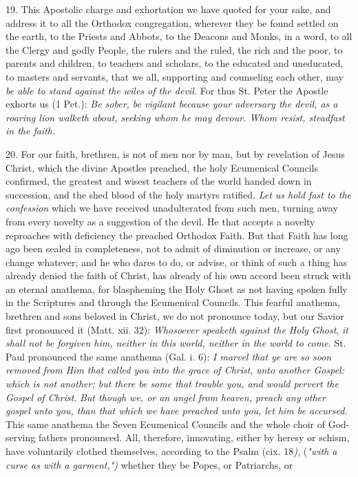19. This Apostolic charge and exhortation we have quoted for your sake,
and address it to all the Orthodox congregation, wherever they be found
settled on the earth, to the Priests and Abbots, to the Deacons and
Monks, in a word, to all the Clergy and godly People, the rulers and the
ruled, the rich and the poor, to parents and children, to teachers and
scholars, to the educated and uneducated, to masters and servants, that
we all, supporting and counseling each other, may \emph{be able to stand
against the wiles of the devil.} For thus St. Peter the Apostle exhorts
us (1 Pet.): \emph{Be sober, be vigilant because your adversary the
devil, as a roaring lion walketh about, seeking whom he may devour. Whom
resist, steadfast in the faith.}

20. For our faith, brethren, is not of men nor by man, but by revelation
of Jesus Christ, which the divine Apostles preached, the holy Ecumenical
Councils confirmed, the greatest and wisest teachers of the world handed
down in succession, and the shed blood of the holy martyrs ratified.
\emph{Let us hold fast to the confession} which we have received
unadulterated from such men, turning away from every novelty as a
suggestion of the devil. He that accepts a novelty reproaches with
deficiency the preached Orthodox Faith. But that Faith has long ago been
sealed in completeness, not to admit of diminution or increase, or any
change whatever; and he who dares to do, or advise, or think of such a
thing has already denied the faith of Christ, has already of his own
accord been struck with an eternal anathema, for blaspheming the Holy
Ghost as not having spoken fully in the Scriptures and through the
Ecumenical Councils. This fearful anathema, brethren and sons beloved in
Christ, we do not pronounce today, but our Savior first pronounced it
(Matt. xii. 32): \emph{Whosoever speaketh against the Holy Ghost},
\emph{it shall not be forgiven him, neither in this world, neither in
the world to come.} St. Paul pronounced the same anathema (Gal. i. 6):
\emph{I marvel that ye are so soon removed from Him that called you into
the grace of Christ}, \emph{unto another Gospel: which is not another;
but there be some that trouble you, and would pervert the Gospel of
Christ}. \emph{But though we, or an angel from heaven, preach any other
gospel unto you, than that which we have preached unto you, let him be
accursed.} This same anathema the Seven Ecumenical Councils and the
whole choir of God-serving fathers pronounced. All, therefore,
innovating, either by heresy or schism, have voluntarily clothed
themselves, according to the Psalm (cix. 18\emph{),} (\emph{"with a
curse as with a garment,")} whether they be Popes, or Patriarchs, or
